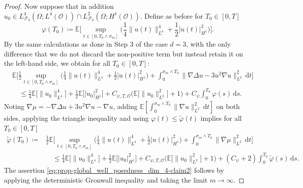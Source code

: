 \documentclass[reqno]{amsart}
\newcommand{\E}{\mathbb{E}}
\newcommand{\F}{\mathscr{F}}
\newcommand{\sO}{\mathscr{O}}
\newcommand{\ce}{\coloneqq}
\newcommand{\1}{\mathbf{1}}
\newcommand{\grad}{\nabla}
\newcommand{\dt}{\,\mathrm{d}t}
\newcommand{\ds}{\,\mathrm{d}s}
\begin{document}
\begin{proof}
Now suppose that in addition $u_0\in L_{\F_0}^4(\Omega;L^4(\sO))\cap L_{\F_0}^2(\Omega;H^1(\sO))$.  
Define as before for $T_0 \in[0,T]$
\begin{equation*}
\varphi(T_0)\ce \E\bigg[\sup_{t\in[0,T_0\wedge \sigma_m]}  \Big(\frac{1}{4}\|u(t)\|_{L^4}^4 +\frac{1}{2}|u(t)|^2_{H^1}\Big)\bigg].
\end{equation*}
By the same calculations as done in Step 3 of the case $d=3$, with the only difference that we do not discard the non-positive term but instead retain it on the left-hand side, we obtain for all $T_0 \in [0,T]$: 
   \begin{align*}
        & \E\bigg[\frac{1}{2} \sup_{t\in[0,T_0\wedge \sigma_m]}  \Big(\frac{1}{4}\|u(t)\|_{L^4}^4 +\frac{1}{2}|u(t)|^2_{H^1}\Big) + \int_0^{\sigma_m \land T_0} \|\grad \Delta u-3u^2 \grad u\|_{L^2}^2 \dt \bigg]\\
        &\quad \le \frac{1}{4} \E\big[\|u_0\|^{4}_{L^4}\big] + \frac{1}{2}\E\big[|u_0|^2_{H^1}\big]+ C_{\psi,T,\sO}\big(\E\big[\|u_0\|_{L^2}^2\big]+1\big)+ C_\psi \int_0^{T_0} \varphi(s) \ds.
    \end{align*}
Noting $\grad \mu = -\grad\Delta u +3u^2\grad u-\grad u$, adding  $\E[\int_0^{\sigma_m \land T_0} \|\grad u\|_{L^2}^2 \dt]$ on both sides, applying the triangle inequality and using $\varphi(t) \leq \tilde{\varphi}(t)$ implies for all $T_0 \in [0,T]$
   \begin{align*}
        \tilde{\varphi}(T_0) \ce & \frac{1}{2}\E\bigg[\sup_{t\in[0,T_0\wedge \sigma_m]}  \Big(\frac{1}{4}\|u(t)\|_{L^4}^4 +\frac{1}{2}|u(t)|^2_{H^1}\Big) + \int_0^{\sigma_m \land T_0} \|\grad \mu\|_{L^2}^2 \dt \bigg]\\
        &\quad \le \frac{1}{4} \E\big[\|u_0\|^{4}_{L^4}\big] + \frac{1}{2}\E\big[|u_0|^2_{H^1}\big]+ C_{\psi,T,\sO}\big(\E\big[\|u_0\|_{L^2}^2\big]+1\big)+ (C_\psi+2) \int_0^{T_0} \tilde{\varphi}(s) \ds.
    \end{align*}
The assertion \eqref{eq:prop-global_well_posedness_dim_4-claim2} follows by applying the deterministic Gronwall inequality and taking the limit $m\to\infty$.
\end{proof}
\end{document}
